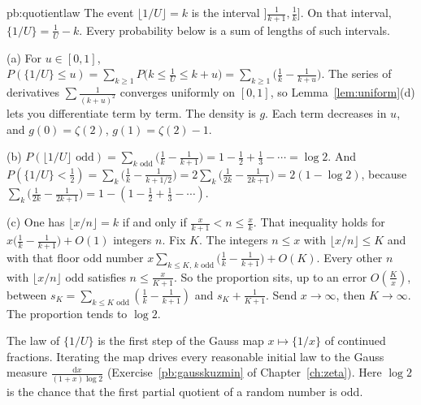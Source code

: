 \begin{solution}{pb:quotientlaw}
\idea The event $\lfloor1/U\rfloor=k$ is the interval $]\frac1{k+1},\frac1k]$. On that interval, $\{1/U\}=\frac1U-k$. Every probability below is a sum of lengths of such intervals.

\writeup (a) For $u\in[0,1]$,
$P(\{1/U\}\le u)=\sum_{k\ge1}P\bigl(k\le\frac1U\le k+u\bigr)=\sum_{k\ge1}\bigl(\frac1k-\frac1{k+u}\bigr)$. The series of derivatives
$\sum\frac1{(k+u)^2}$ converges uniformly on $[0,1]$, so Lemma~\ref{lem:uniform}(d) lets you differentiate term by term. The density is $g$. Each term
decreases in $u$, and $g(0)=\zeta(2)$, $g(1)=\zeta(2)-1$.

(b) $P(\lfloor1/U\rfloor\text{ odd})=\sum_{k\text{ odd}}\bigl(\frac1k-\frac1{k+1}\bigr)=1-\frac12+\frac13-\cdots=\log2$. And
$P(\{1/U\}<\frac12)=\sum_k\bigl(\frac1k-\frac1{k+1/2}\bigr)=2\sum_k\bigl(\frac1{2k}-\frac1{2k+1}\bigr)=2(1-\log2)$, because $\sum_k\bigl(\frac1{2k}-\frac1{2k+1}\bigr)=1-(1-\frac12+\frac13-\cdots)$.

(c) One has $\lfloor x/n\rfloor=k$ if and only if $\frac x{k+1}<n\le\frac xk$. That inequality holds for $x\bigl(\frac1k-\frac1{k+1}\bigr)+O(1)$ integers $n$. Fix $K$. The integers $n\le x$
with $\lfloor x/n\rfloor\le K$ and with that floor odd number $x\sum_{k\le K,\,k\text{ odd}}\bigl(\frac1k-\frac1{k+1}\bigr)+O(K)$. Every other $n$ with $\lfloor x/n\rfloor$ odd
satisfies $n\le\frac x{K+1}$. So the proportion sits, up to an error $O(\frac Kx)$, between $s_K=\sum_{k\le K\text{ odd}}(\frac1k-\frac1{k+1})$ and $s_K+\frac1{K+1}$. Send
$x\to\infty$, then $K\to\infty$. The proportion tends to $\log2$.

\leads The law of $\{1/U\}$ is the first step of the Gauss map $x\mapsto\{1/x\}$ of continued fractions. Iterating the map drives every reasonable
initial law to the Gauss measure $\frac{\mathrm dx}{(1+x)\log2}$ (Exercise~\ref{pb:gausskuzmin} of Chapter~\ref{ch:zeta}). Here $\log2$ is the chance that
the first partial quotient of a random number is odd.
\end{solution}

